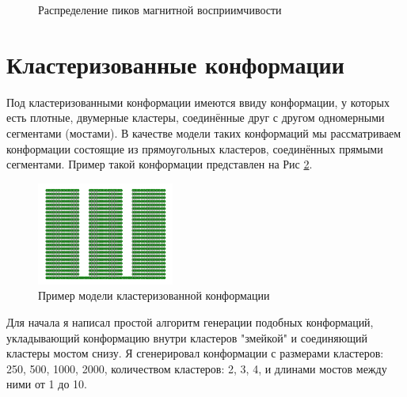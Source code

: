 \documentclass[14pt]{extarticle}
\begin{document}
\begin{figure}[ht]
	\centering
	
	\caption{Распределение пиков магнитной восприимчивости}
	\label{fig:MS_peaks_distr}
\end{figure}

\section{Кластеризованные конформации}
Под кластеризованными конформации имеются ввиду конформации, у которых есть плотные, двумерные кластеры, соединённые друг с другом одномерными сегментами (мостами). В качестве модели таких конформаций мы рассматриваем конформации состоящие из прямоугольных кластеров, соединённых прямыми сегментами. Пример такой конформации представлен на Рис \ref{fig:cluster_conf_example}.

\begin{figure}[ht]
	\centering
	\includegraphics*[width=0.4\textwidth]{../images/3Cluster_conformation_short.png}
	\caption{Пример модели кластеризованной конформации}
	\label{fig:cluster_conf_example}
\end{figure}

Для начала я написал простой алгоритм генерации подобных конформаций, укладывающий конформацию внутри кластеров "змейкой" и соединяющий кластеры мостом снизу.
Я сгенерировал конформации с размерами кластеров: 250, 500, 1000, 2000, количеством кластеров: 2, 3, 4, и длинами мостов между ними от 1 до 10.
\end{document}
